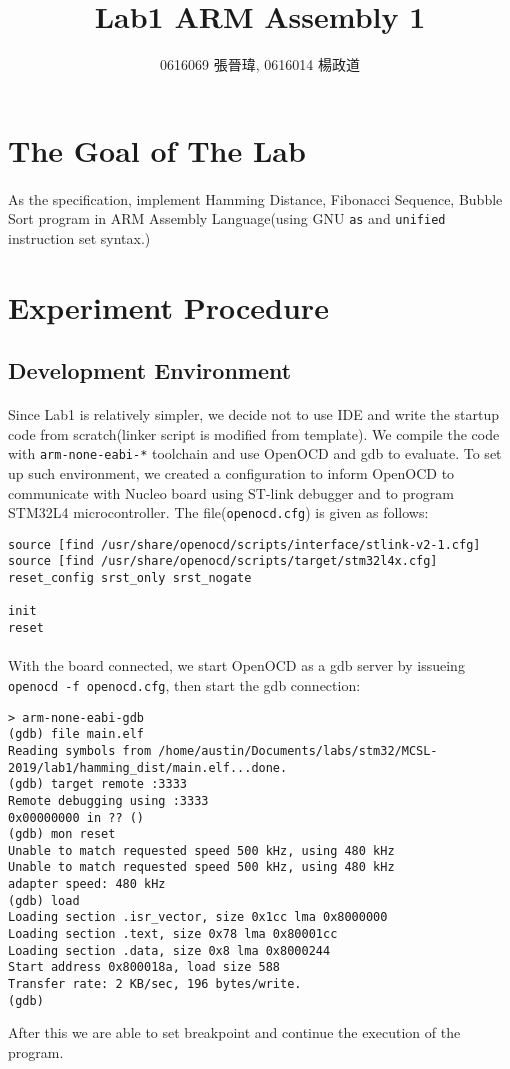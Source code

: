 \title{Lab1 ARM Assembly 1}
\author{0616069 張晉瑋, 0616014 楊政道}
\maketitle
\thispagestyle{fancy}
\section{The Goal of The Lab}
\paragraph{}
As the specification, implement Hamming Distance, Fibonacci Sequence, Bubble Sort program in ARM Assembly Language(using GNU \texttt{as} and \texttt{unified} instruction set syntax.)
\section{Experiment Procedure}
\subsection{Development Environment}
\paragraph{}
Since Lab1 is relatively simpler, we decide not to use IDE and write the startup code from scratch(linker script is modified from template).
We compile the code with \texttt{arm-none-eabi-*} toolchain and use OpenOCD and gdb to evaluate.
To set up such environment, we created a configuration to inform OpenOCD to communicate with Nucleo board using ST-link debugger and to program STM32L4 microcontroller.
The file(\texttt{openocd.cfg}) is given as follows:
\begin{lstlisting}
source [find /usr/share/openocd/scripts/interface/stlink-v2-1.cfg]
source [find /usr/share/openocd/scripts/target/stm32l4x.cfg]
reset_config srst_only srst_nogate

init
reset
\end{lstlisting}
\paragraph{}
With the board connected, we start OpenOCD as a gdb server by issueing \texttt{openocd -f openocd.cfg}, then start the gdb connection:
\begin{lstlisting}
> arm-none-eabi-gdb
(gdb) file main.elf
Reading symbols from /home/austin/Documents/labs/stm32/MCSL-2019/lab1/hamming_dist/main.elf...done.
(gdb) target remote :3333
Remote debugging using :3333
0x00000000 in ?? ()
(gdb) mon reset
Unable to match requested speed 500 kHz, using 480 kHz
Unable to match requested speed 500 kHz, using 480 kHz
adapter speed: 480 kHz
(gdb) load
Loading section .isr_vector, size 0x1cc lma 0x8000000
Loading section .text, size 0x78 lma 0x80001cc
Loading section .data, size 0x8 lma 0x8000244
Start address 0x800018a, load size 588
Transfer rate: 2 KB/sec, 196 bytes/write.
(gdb)
\end{lstlisting}
After this we are able to set breakpoint and continue the execution of the program.
